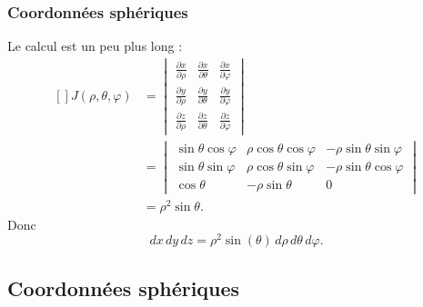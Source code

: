 \subsubsection{Coordonnées sphériques}

Le calcul est un peu plus long :
\begin{equation}
    \begin{aligned}[]
        J(\rho,\theta,\varphi)&=\begin{vmatrix}
            \frac{ \partial x }{ \partial \rho }    &   \frac{ \partial x }{ \partial \theta }    &   \frac{ \partial x }{ \partial \varphi }    \\
            \frac{ \partial y }{ \partial \rho }    &   \frac{ \partial y }{ \partial \theta }    &   \frac{ \partial y }{ \partial \varphi }    \\
            \frac{ \partial z }{ \partial \rho }    &   \frac{ \partial z }{ \partial \theta }    &   \frac{ \partial z }{ \partial \varphi }
        \end{vmatrix}\\
        &=
        \begin{vmatrix}
            \sin\theta\cos\varphi    &   \rho\cos\theta\cos\varphi    &   -\rho\sin\theta\sin\varphi    \\
            \sin\theta\sin\varphi    &   \rho\cos\theta\sin\varphi    &   -\rho\sin\theta\cos\varphi    \\
            \cos\theta               &   -\rho\sin\theta              &   0
        \end{vmatrix}\\
        &=\rho^2\sin\theta.
    \end{aligned}
\end{equation}
Donc
\begin{equation}
    dx\,dy\,dz=\rho^2\sin(\theta)\,d\rho\,d\theta\,d\varphi.
\end{equation}

\subsection{Coordonnées sphériques}

